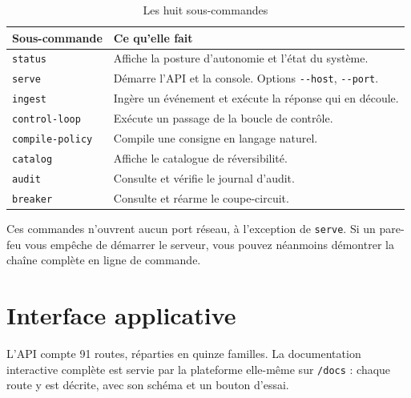 \begin{table}[h]
\centering
\begin{tabular}{@{}p{3.8cm}p{10cm}@{}}
\toprule
\textbf{Sous-commande} & \textbf{Ce qu'elle fait} \\
\midrule
\texttt{status} & Affiche la posture d'autonomie et l'état du système. \\[4pt]
\texttt{serve} & Démarre l'API et la console.
Options \texttt{-{}-host}, \texttt{-{}-port}. \\[4pt]
\texttt{ingest} & Ingère un événement et exécute la réponse qui en découle. \\[4pt]
\texttt{control-loop} & Exécute un passage de la boucle de contrôle. \\[4pt]
\texttt{compile-policy} & Compile une consigne en langage naturel. \\[4pt]
\texttt{catalog} & Affiche le catalogue de réversibilité. \\[4pt]
\texttt{audit} & Consulte et vérifie le journal d'audit. \\[4pt]
\texttt{breaker} & Consulte et réarme le coupe-circuit. \\
\bottomrule
\end{tabular}
\caption{Les huit sous-commandes}
\end{table}

\begin{tcolorbox}[colback=green!4!white, colframe=darkgreen,
  title=\textbf{Bon à savoir}, fonttitle=\bfseries, boxrule=0.6pt]
Ces commandes n'ouvrent aucun port réseau, à l'exception de \texttt{serve}. Si
un pare-feu vous empêche de démarrer le serveur, vous pouvez néanmoins
démontrer la chaîne complète en ligne de commande.
\end{tcolorbox}

\chapter{Interface applicative}

L'API compte 91 routes, réparties en quinze familles. La documentation
interactive complète est servie par la plateforme elle-même sur
\texttt{/docs} : chaque route y est décrite, avec son schéma et un bouton
d'essai.


